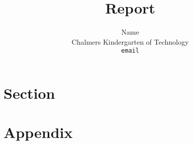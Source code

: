 \documentclass[a4paper,11pt]{article}
\begin{document}
\title{Report}
\author{Name \\
   Chalmers Kindergarten of Technology \\
   \texttt{email}}

\maketitle

\begin{abstract}
\end{abstract}

\tableofcontents

\section{Section}

\section{Appendix}
\end{document}

